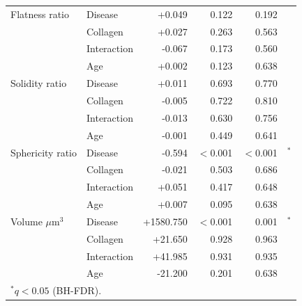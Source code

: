 \documentclass[11pt,a4paper]{article}
\begin{document}
\begin{longtable}{llrrrr}
  Flatness ratio & Disease & +0.049 & 0.122 & 0.192 &  \\
   & Collagen & +0.027 & 0.263 & 0.563 &  \\
   & Interaction & -0.067 & 0.173 & 0.560 &  \\
   & Age & +0.002 & 0.123 & 0.638 &  \\
  Solidity ratio & Disease & +0.011 & 0.693 & 0.770 &  \\
   & Collagen & -0.005 & 0.722 & 0.810 &  \\
   & Interaction & -0.013 & 0.630 & 0.756 &  \\
   & Age & -0.001 & 0.449 & 0.641 &  \\
  Sphericity ratio & Disease & -0.594 & $<$0.001 & $<$0.001 & $^{*}$ \\
   & Collagen & -0.021 & 0.503 & 0.686 &  \\
   & Interaction & +0.051 & 0.417 & 0.648 &  \\
   & Age & +0.007 & 0.095 & 0.638 &  \\
  Volume $\mu$m$^{3}$ & Disease & +1580.750 & $<$0.001 & 0.001 & $^{*}$ \\
   & Collagen & +21.650 & 0.928 & 0.963 &  \\
   & Interaction & +41.985 & 0.931 & 0.935 &  \\
   & Age & -21.200 & 0.201 & 0.638 &  \\
\bottomrule
\multicolumn{6}{l}{\footnotesize $^{*}q < 0.05$ (BH-FDR).} \\
\end{longtable}
\end{document}
